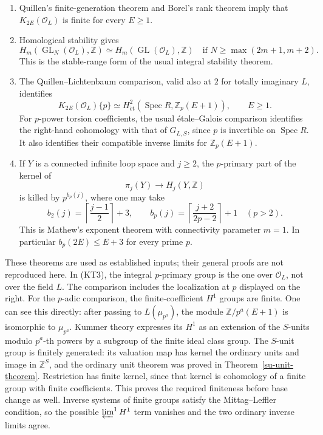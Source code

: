 \begin{enumerate}
\item Quillen's finite-generation theorem and Borel's rank
theorem imply that \(K_{2E}(\mathcal O_L)\) is finite for
every \(E\ge1\).
\cite[IV, Theorems 6.9 and 1.17--1.18]{weibel-kbook}
\item Homological stability gives
\[
 H_m(\operatorname{GL}_N(\mathcal O_L),\mathbb Z)
       \simeq H_m(\operatorname{GL}(\mathcal O_L),\mathbb Z)
       \quad\text{if }N\ge\max(2m+1,m+2).
 \tag{KT2}
\]
This is the stable-range form of the usual integral
stability theorem.\cite[IV, Corollary 1.14.1]{weibel-kbook}
\item The Quillen--Lichtenbaum comparison, valid also at \(2\)
for totally imaginary \(L\), identifies
\[
 K_{2E}(\mathcal O_L)\{p\}
       \simeq H^2_{\mathrm{\acute et}}
                  (\operatorname{Spec}R,\mathbb Z_p(E+1)),
                    \qquad E\ge1.
 \tag{KT3}
\]
\cite[VI, Theorem 8.2]{weibel-kbook}
For \(p\)-power torsion coefficients, the usual
\'etale--Galois comparison identifies the right-hand
cohomology with that of \(G_{L,S}\), since \(p\) is
invertible on \(\operatorname{Spec}R\).
It also identifies their compatible inverse limits for
\(\mathbb Z_p(E+1)\).
\cite[II, Proposition 2.9]{milne-adt}
\item If \(Y\) is a connected infinite loop space and \(j\ge2\),
the \(p\)-primary part of the kernel of
\[
            \pi_j(Y)\longrightarrow H_j(Y,\mathbb Z)
\]
is killed by \(p^{b_p(j)}\), where one may take
\[
 b_2(j)=\left\lceil\frac{j-1}{2}\right\rceil+3,\qquad
 b_p(j)=\left\lceil\frac{j+2}{2p-2}\right\rceil+1
                  \quad(p>2).
 \tag{KT4}
\]
This is Mathew's exponent theorem with connectivity
parameter \(m=1\).\cite[Theorem 6.3]{mathew-hurewicz}
In particular \(b_p(2E)\le E+3\) for every prime \(p\).
\end{enumerate}

These theorems are used as established inputs; their general
proofs are not reproduced here.  In (KT3), the integral
\(p\)-primary group is the one over \(\mathcal O_L\), not
over the field \(L\).  The comparison includes the
localization at \(p\) displayed on the right.
For the \(p\)-adic comparison, the finite-coefficient
\(H^1\) groups are finite.  One can see this directly:
after passing to \(L(\mu_{p^a})\), the module
\(\mathbb Z/p^a(E+1)\) is isomorphic to \(\mu_{p^a}\).
Kummer theory expresses its \(H^1\) as an extension of
the \(S\)-units modulo \(p^a\)-th powers by a subgroup
of the finite ideal class group.
The \(S\)-unit group is finitely generated: its valuation
map has kernel the ordinary units and image in
\(\mathbb Z^S\), and the ordinary unit theorem was
proved in Theorem~\ref{su-unit-theorem}.
Restriction has finite kernel, since that kernel is
cohomology of a finite group with finite coefficients.
This proves the required finiteness before base change as well.
Inverse systems of finite groups satisfy the
Mittag--Leffler condition, so the possible
\(\varprojlim^1H^1\) term vanishes and the two ordinary
inverse limits agree.


